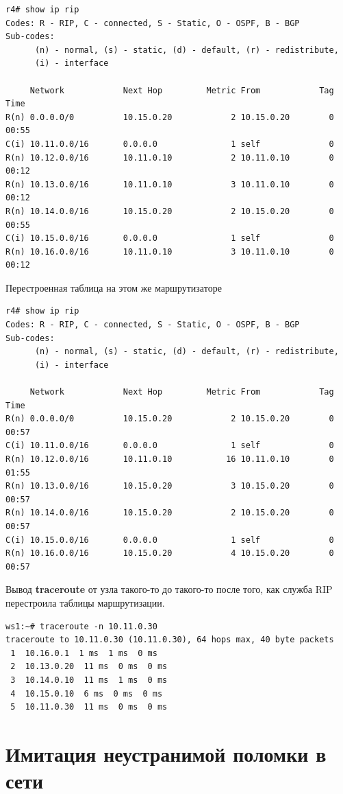 \documentclass[a4paper,12pt]{article}
\begin{document}
\begin{Verbatim}
r4# show ip rip
Codes: R - RIP, C - connected, S - Static, O - OSPF, B - BGP
Sub-codes:
      (n) - normal, (s) - static, (d) - default, (r) - redistribute,
      (i) - interface

     Network            Next Hop         Metric From            Tag Time
R(n) 0.0.0.0/0          10.15.0.20            2 10.15.0.20        0 00:55
C(i) 10.11.0.0/16       0.0.0.0               1 self              0
R(n) 10.12.0.0/16       10.11.0.10            2 10.11.0.10        0 00:12
R(n) 10.13.0.0/16       10.11.0.10            3 10.11.0.10        0 00:12
R(n) 10.14.0.0/16       10.15.0.20            2 10.15.0.20        0 00:55
C(i) 10.15.0.0/16       0.0.0.0               1 self              0
R(n) 10.16.0.0/16       10.11.0.10            3 10.11.0.10        0 00:12
\end{Verbatim}

Перестроенная таблица на этом же маршрутизаторе

\begin{Verbatim}
r4# show ip rip
Codes: R - RIP, C - connected, S - Static, O - OSPF, B - BGP
Sub-codes:
      (n) - normal, (s) - static, (d) - default, (r) - redistribute,
      (i) - interface

     Network            Next Hop         Metric From            Tag Time
R(n) 0.0.0.0/0          10.15.0.20            2 10.15.0.20        0 00:57
C(i) 10.11.0.0/16       0.0.0.0               1 self              0
R(n) 10.12.0.0/16       10.11.0.10           16 10.11.0.10        0 01:55
R(n) 10.13.0.0/16       10.15.0.20            3 10.15.0.20        0 00:57
R(n) 10.14.0.0/16       10.15.0.20            2 10.15.0.20        0 00:57
C(i) 10.15.0.0/16       0.0.0.0               1 self              0
R(n) 10.16.0.0/16       10.15.0.20            4 10.15.0.20        0 00:57
\end{Verbatim}


Вывод \textbf{traceroute} от узла такого-то до такого-то после того, как служба RIP перестроила таблицы маршрутизации.

\begin{Verbatim}
ws1:~# traceroute -n 10.11.0.30
traceroute to 10.11.0.30 (10.11.0.30), 64 hops max, 40 byte packets
 1  10.16.0.1  1 ms  1 ms  0 ms
 2  10.13.0.20  11 ms  0 ms  0 ms
 3  10.14.0.10  11 ms  1 ms  0 ms
 4  10.15.0.10  6 ms  0 ms  0 ms
 5  10.11.0.30  11 ms  0 ms  0 ms
\end{Verbatim}

\section{Имитация неустранимой поломки в сети}
\end{document}
